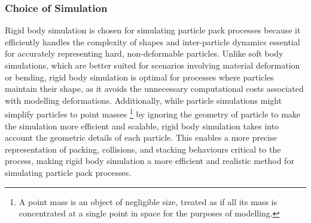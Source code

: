 \documentclass[preprint,12pt]{elsarticle}
\begin{document}
\subsubsection{Choice of Simulation}
Rigid body simulation is chosen for simulating particle pack processes because it efficiently handles the complexity of shapes and inter-particle dynamics essential for accurately representing hard, non-deformable particles. 
Unlike soft body simulations, which are better suited for scenarios involving material deformation or bending, rigid body simulation is optimal for processes where particles maintain their shape, as it avoids the unnecessary computational costs associated with modelling deformations. 
Additionally, while particle simulations might simplify particles to point masses \footnote{A point mass is an object of negligible size, treated as if all its mass is concentrated at a single point in space for the purposes of modelling.} by ignoring the geometry of particle to make the simulation more efficient and scalable, rigid body simulation takes into account the geometric details of each particle. 
This enables a more precise representation of packing, collisions, and stacking behaviours critical to the process, making rigid body simulation a more efficient and realistic method for simulating particle pack processes.
\end{document}
